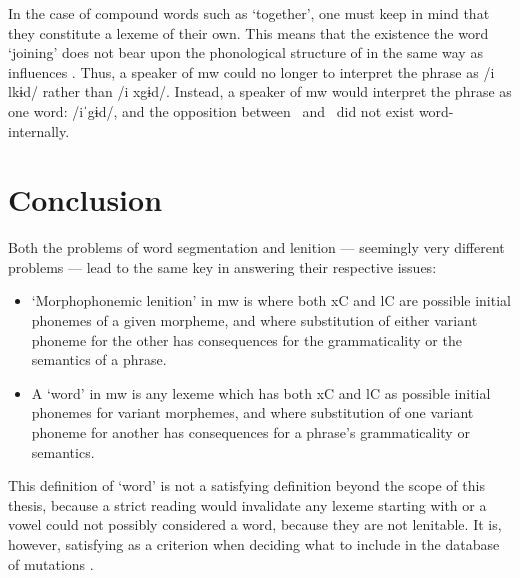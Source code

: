 In the case of compound words such as  `together', one must keep in mind that they constitute a lexeme of their own. This means that the existence the word  `joining' does not bear upon the phonological structure of  in the same way as  influences . Thus, a speaker of \gls{mw} could no longer to interpret the phrase  as /i \gls{l}kɨd/ rather than /i \gls{x}gɨd/. Instead, a speaker of \gls{mw} would interpret the phrase as one word: /iˈgɨd/, and the opposition between \lT\ and \xD\ did not exist word-internally.



\section{Conclusion}

Both the problems of word segmentation and lenition --- seemingly very different problems --- lead to the same key in answering their respective issues: 
\begin{itemize}
    \item `Morphophonemic lenition' in \gls{mw} is where both \gls{x}\gls{C}  and \gls{l}\gls{C} are possible initial phonemes of a given morpheme, and where  substitution of either variant phoneme for the other has consequences for the grammaticality or the semantics of a phrase.
    \item A `word' in \gls{mw} is any lexeme which has both \gls{x}\gls{C} and \gls{l}\gls{C} as possible initial phonemes for variant morphemes, and where  substitution of one variant phoneme for another has consequences for a phrase's grammaticality or semantics.
\end{itemize}
This definition of `word' is not a satisfying definition beyond the scope of this thesis, because a strict reading would invalidate any lexeme starting with  or a vowel could not possibly considered a word, because they are not lenitable. It is, however, satisfying as a criterion when deciding what to include in the database of mutations .